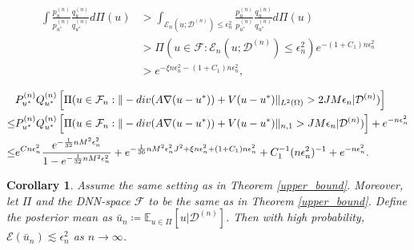 \documentclass[10pt,a4paper]{amsart}
\newtheorem{corollary}{Corollary}
\newcommand{\D}{\mathcal{D}}
\newcommand{\E}{\mathbb{E}}
\newcommand{\F}{\mathcal{F}}
\renewcommand{\div}{\textnormal{div}}
\begin{document}
\begin{equation} \label{lower_bound_denominator}
    \begin{aligned}
        \int \frac{p_{u}^{(n)}}{p_{u^*}^{(n)}} \frac{q_{u}^{(n)}}{q_{u^*}^{(n)}} d \Pi(u) & > \int_{\mathcal{E}_n(u; \D^{(n)}) \leq \epsilon_n^2} \frac{p_{u}^{(n)}}{p_{u^*}^{(n)}} \frac{q_{u}^{(n)}}{q_{u^*}^{(n)}} d \Pi(u) \\
    & > \Pi(u \in \F: \mathcal{E}_n(u; \D^{(n)}) \leq \epsilon_n^2) e^{-(1+C_1) n\epsilon_n^2 } \\
    & > e^{-\xi n\epsilon_n^2 - (1+C_1) n \epsilon_n^2},
    \end{aligned}
\end{equation}

\begin{equation} \label{first_term_pupulation}
    \begin{aligned}
        & P_{u^*}^{(n)} Q_{u^*}^{(n)} \left[\Pi(u \in \F_n:  \|-\div(A \nabla (u-u^*)) + V(u-u^*) \|_{L^2(\Omega)} > 2 J M \epsilon_n| \D^{(n)})\right] \\
        \leq & P_{u^*}^{(n)} Q_{u^*}^{(n)} \left[\Pi(u \in \F_n: \|-\div(A \nabla (u-u^*)) + V(u-u^*) \|_{n, 1} >  J M \epsilon_n | \D^{(n)} ) \right] + e^{-n\epsilon_n^2} \\
        \leq & e^{C n \epsilon_n^2} \frac{e^{-\frac{1}{32}n M^2 \epsilon_n^2}}{1 - e^{-\frac{1}{32}n M^2 \epsilon_n^2}} + e^{-\frac{1}{36} n M^2 \epsilon_{n}^2 J^2 + \xi n\epsilon_n^2 + (1+C_1) n \epsilon_n^2} + C_1^{-1} (n\epsilon_n^2)^{-1} + e^{-n\epsilon_n^2}. 
    \end{aligned}
\end{equation}

\begin{corollary} \label{upper_bound_posterior_mean}
    Assume the same setting as in Theorem \ref{upper_bound}. Moreover, let $\Pi$ and the DNN-space $\F$ to be the same as in Theorem \ref{upper_bound}. Define the posterior mean as $\bar{u}_n \coloneqq \E_{u \in \Pi} \left[u | \D^{(n)}\right]$. Then with high probability,  $\mathcal{E}(\bar{u}_n)  \lesssim \epsilon_n^2$ as $n \rightarrow \infty$. 
    
\end{corollary}
\end{document}
